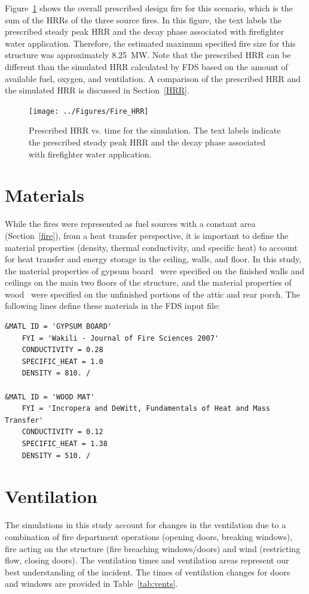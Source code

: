\documentclass[12pt,oneside]{book}
\begin{document}
Figure~\ref{fig:hrr} shows the overall prescribed design fire for this scenario, which is the sum of the HRRs of the three source fires. In this figure, the text labels the prescribed steady peak HRR and the decay phase associated with firefighter water application. Therefore, the estimated maximum specified fire size for this structure was approximately 8.25~MW. Note that the prescribed HRR can be different than the simulated HRR calculated by FDS based on the amount of available fuel, oxygen, and ventilation. A comparison of the prescribed HRR and the simulated HRR is discussed in Section~\ref{HRR}.

\begin{figure}[!ht]
\texttt{[image: ../Figures/Fire\_HRR]}
\caption[Prescribed HRR vs. time for the simulation.]
{Prescribed HRR vs. time for the simulation. The text labels indicate the prescribed steady peak HRR and the decay phase associated with firefighter water application.}
\label{fig:hrr}
\end{figure}

\clearpage

\section{Materials}
\label{matl}
While the fires were represented as fuel sources with a constant area (Section~\ref{fire}), from a heat transfer perspective, it is important to define the material properties (density, thermal conductivity, and specific heat) to account for heat transfer and energy storage in the ceiling, walls, and floor. In this study, the material properties of gypsum board~\cite{WAKILI2007} were specified on the finished walls and ceilings on the main two floors of the structure, and the material properties of wood~\cite{Incropera:1} were specified on the unfinished portions of the attic and rear porch. The following lines define these materials in the FDS input file:

\begin{lstlisting}
&MATL ID = 'GYPSUM BOARD'
    FYI = 'Wakili - Journal of Fire Sciences 2007' 
    CONDUCTIVITY = 0.28
    SPECIFIC_HEAT = 1.0
    DENSITY = 810. /

&MATL ID = 'WOOD MAT'
    FYI = 'Incropera and DeWitt, Fundamentals of Heat and Mass Transfer'
    CONDUCTIVITY = 0.12
    SPECIFIC_HEAT = 1.38
    DENSITY = 510. / 
\end{lstlisting}

\section{Ventilation}
\label{Vents}
The simulations in this study account for changes in the ventilation due to a combination of fire department operations (opening doors, breaking windows), fire acting on the structure (fire breaching windows/doors) and wind (restricting flow, closing doors). The ventilation times and ventilation areas represent our best understanding of the incident. The times of ventilation changes for doors and windows are provided in Table~\ref{tab:vents}.
\end{document}
